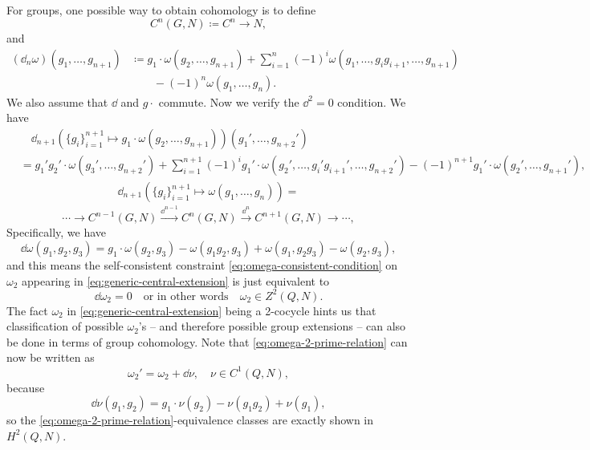 \documentclass[hyperref, a4paper]{article}
\begin{document}
For groups, one possible way to obtain cohomology is to define 
\begin{equation}
    C^n(G, N) \coloneqq C^n \to N,
\end{equation}
and 
\begin{equation}
    \begin{aligned}
        (\dd_n \omega)(g_1, \ldots, g_{n+1}) &\coloneqq g_1 \cdot \omega(g_2, \ldots, g_{n+1}) + \sum_{i=1}^{n} (-1)^i \omega(g_1, \ldots, g_i g_{i+1}, \ldots, g_{n+1})  \\
        &\quad \quad - (-1)^n \omega(g_1, \ldots, g_n).
    \end{aligned}
    \label{eq:group-cohomology-def-generic}
\end{equation}
We also assume that $\dd$ and $g \cdot$ commute.
Now we verify the $\dd^2 = 0$ condition. We have 
\[
    \begin{aligned}
        &\quad\dd_{n+1} (\{g_i\}_{i=1}^{n+1} \mapsto g_1 \cdot \omega(g_2, \ldots, g_{n+1})) (g_1', \ldots, g_{n+2}') \\
        &= g_1' g_2' \cdot \omega(g_3', \ldots, g_{n+2}') + \sum_{i=1}^{n+1} (-1)^i g_1' \cdot \omega(g_2', \ldots, g_i' g_{i+1}', \ldots, g_{n+2}') - (-1)^{n+1} g_1' \cdot \omega(g_2', \ldots, g_{n+1}'),
    \end{aligned}
\]
\[
    \begin{aligned}
        \dd_{n+1} (\{g_i\}_{i=1}^{n+1} \mapsto \omega(g_1, \ldots, g_n)) = 
    \end{aligned}
\]
\begin{equation}
    \cdots \to C^{n-1}(G, N) \stackrel{\dd^{n-1}}{\longrightarrow} C^n(G, N) \stackrel{\dd^n}{\longrightarrow} C^{n+1}(G, N) \to \cdots ,
\end{equation}
Specifically, we have 
\begin{equation}
    \dd{\omega}(g_1, g_2, g_3) = g_1 \cdot \omega(g_2, g_3) - \omega(g_1 g_2, g_3) + \omega(g_1, g_2 g_3) - \omega(g_2, g_3),
\end{equation}
and this means the self-consistent constraint \eqref{eq:omega-consistent-condition} on $\omega_2$ 
appearing in \eqref{eq:generic-central-extension} is just equivalent to 
\begin{equation}
    \dd{\omega_2} = 0 \quad \text{or in other words} \quad \omega_2 \in Z^2(Q, N).
\end{equation}
The fact $\omega_2$ in \eqref{eq:generic-central-extension} being a 2-cocycle hints us that 
classification of possible $\omega_2$'s -- and therefore possible group extensions -- can also be 
done in terms of group cohomology. Note that \eqref{eq:omega-2-prime-relation} can now be written as 
\begin{equation}
    \omega_2' = \omega_2 + \dd{\nu}, \quad \nu \in C^1(Q, N),
\end{equation}
because 
\begin{equation}
    \dd{\nu}(g_1, g_2) = g_1 \cdot \nu(g_2) - \nu(g_1 g_2) + \nu(g_1),
\end{equation}
so the \eqref{eq:omega-2-prime-relation}-equivalence classes are exactly shown in $H^2(Q, N)$.
\end{document}
